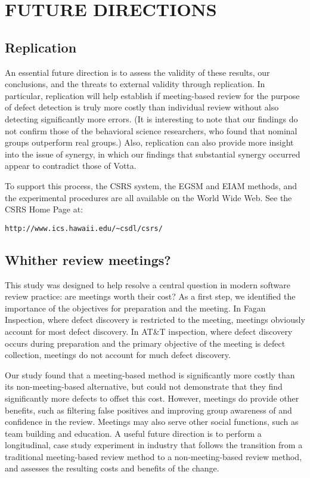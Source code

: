 \section{FUTURE DIRECTIONS}

\subsection{Replication}

An essential future direction is to assess the validity of these results,
our conclusions, and the threats to external validity through replication.
In particular, replication will help establish if meeting-based review for
the purpose of defect detection is truly more costly than individual review
without also detecting significantly more errors. (It is interesting to
note that our findings do not confirm those of the behavioral science
researchers, who found that nominal groups outperform real groups.) Also,
replication can also provide more insight into the issue of synergy, in
which our findings that substantial synergy occurred appear to contradict those of
Votta. 

To support this process, the CSRS system, the EGSM and EIAM methods, and
the experimental procedures are all available on the World Wide Web.  See
the CSRS Home Page at:
\small
\begin{verbatim}
http://www.ics.hawaii.edu/~csdl/csrs/
\end{verbatim}
\normalsize

\subsection{Whither review meetings?}

This study was designed to help resolve a central question in modern
software review practice: are meetings worth their cost?  As a first step,
we identified the importance of the objectives for preparation and the
meeting. In Fagan Inspection, where defect discovery is restricted to the
meeting, meetings obviously account for most defect discovery. In AT\&T
inspection, where defect discovery occurs during preparation and the
primary objective of the meeting is defect collection, meetings do not
account for much defect discovery.

Our study found that a meeting-based method is significantly more costly
than its non-meeting-based alternative, but could not demonstrate that they
find significantly more defects to offset this cost. However, meetings do
provide other benefits, such as filtering false positives and improving
group awareness of and confidence in the review. Meetings may also serve
other social functions, such as team building and education.  A useful
future direction is to perform a longitudinal, case study experiment in
industry that follows the transition from a traditional meeting-based
review method to a non-meeting-based review method, and assesses the resulting costs
and benefits of the change.

